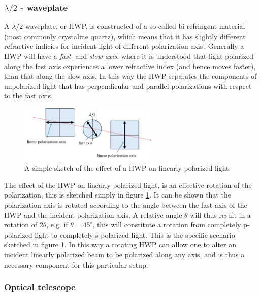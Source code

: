 \subsubsection{$\lambda / 2$ - waveplate}

A $\lambda/2$-waveplate, or HWP, is constructed of a so-called bi-refringent material (most commonly crystaline quartz), which means that it has slightly different refractive indicies for incident light of different polarization axis'. Generally a HWP will have a \emph{fast}- and \emph{slow axis}, where it is understood that light polarized along the fast axis experiences a lower refractive index (and hence moves faster), than that along the slow axis. In this way the HWP separates the components of unpolarized light that has perpendicular and parallel polarizations with respect to the fast axis. 

\begin{figure}[h!]
    \centering
    \includegraphics[width=0.6\textwidth]{figures/HWP.pdf}
    \caption{A simple sketch of the effect of a HWP on linearly polarized light.}
    \label{fig:HWP}
\end{figure}

The effect of the HWP on linearly polarized light, is an effective rotation of the polarization, this is sketched simply in figure \ref{fig:HWP}. It can be shown that the polarization axis is rotated according to the angle between the fast axis of the HWP and the incident polarization axis. A relative angle $\theta$ will thus result in a rotation of $2\theta$, e.g. if $\theta=45^{\circ}$, this will constitute a rotation from completely p-polarized light to completely s-polarized light. This is the specific scenario sketched in figure \ref{fig:HWP}\cite{edmund_optics}. In this way a rotating HWP can allow one to alter an incident linearly polarized beam to be polarized along any axis, and is thus a necessary component for this particular setup.

\subsubsection{Optical telescope}

